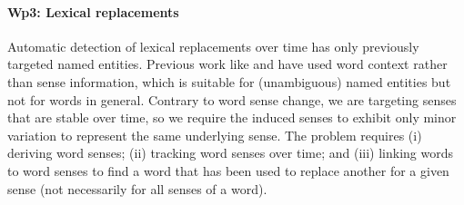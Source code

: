 \documentclass[12pt,twoside,a4paper]{article}
\begin{document}
%	
\vspace{-0.3cm}	
	
	\paragraph{Wp3: Lexical replacements}
	Automatic detection of lexical replacements over time has only previously targeted named entities. Previous work like \cite{journals/tkde/ZhangJBT16} and \cite{BerberichBSW09} have used word context rather than sense information, which is suitable for (unambiguous) named entities but not for words in general. Contrary to word sense change, we are targeting senses that are stable over time, so we require the induced senses to exhibit only minor variation to represent the same underlying sense. The problem requires (i) deriving word senses; (ii) tracking word senses over time; and (iii) linking words to word senses to find a word that has been used to replace another for a given sense (not necessarily for all senses of a word). 
\end{document}
